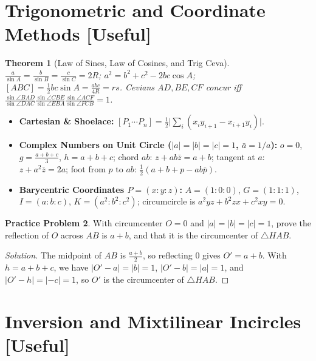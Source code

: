 \documentclass[11pt]{article}
\theoremstyle{plain}
\newtheorem{theorem}{Theorem}[section]
\theoremstyle{definition}
\newtheorem{problem}[theorem]{Practice Problem}
\newenvironment{solution}{\begin{proof}[Solution]}{\end{proof}}
\begin{document}
\section{Trigonometric and Coordinate Methods [Useful]}

\begin{theorem}[Law of Sines, Law of Cosines, and Trig Ceva]
$\frac{a}{\sin A} = \frac{b}{\sin B} = \frac{c}{\sin C} = 2R$; $a^2 = b^2+c^2-2bc\cos A$; $[ABC] = \frac12 bc\sin A = \frac{abc}{4R} = rs$. Cevians $AD, BE, CF$ concur iff $\frac{\sin\angle BAD}{\sin\angle DAC}\frac{\sin\angle CBE}{\sin\angle EBA}\frac{\sin\angle ACF}{\sin\angle FCB} = 1$.
\end{theorem}

\begin{itemize}
\item \textbf{Cartesian \& Shoelace:} $[P_1\cdots P_n] = \frac12\bigl|\sum_i (x_i y_{i+1} - x_{i+1}y_i)\bigr|$.
\item \textbf{Complex Numbers on Unit Circle ($|a|=|b|=|c|=1$, $\bar a = 1/a$):} $o=0$, $g=\frac{a+b+c}{3}$, $h=a+b+c$; chord $ab$: $z+ab\bar z = a+b$; tangent at $a$: $z+a^2\bar z = 2a$; foot from $p$ to $ab$: $\frac12(a+b+p-ab\bar p)$.
\item \textbf{Barycentric Coordinates $P=(x:y:z)$:} $A=(1:0:0)$, $G=(1:1:1)$, $I=(a:b:c)$, $K=(a^2:b^2:c^2)$; circumcircle is $a^2yz + b^2zx + c^2xy = 0$.
\end{itemize}

\begin{problem}
With circumcenter $O=0$ and $|a|=|b|=|c|=1$, prove the reflection of $O$ across $AB$ is $a+b$, and that it is the circumcenter of $\triangle HAB$.
\end{problem}
\begin{solution}
The midpoint of $AB$ is $\frac{a+b}{2}$, so reflecting $0$ gives $O' = a+b$. With $h=a+b+c$, we have $|O'-a|=|b|=1$, $|O'-b|=|a|=1$, and $|O'-h|=|-c|=1$, so $O'$ is the circumcenter of $\triangle HAB$.
\end{solution}

\section{Inversion and Mixtilinear Incircles [Useful]}
\end{document}
